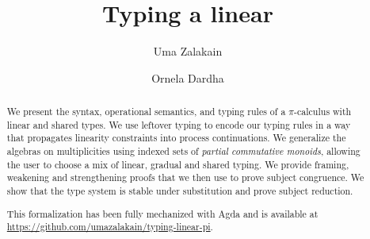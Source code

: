 \documentclass[a4paper,UKenglish,cleveref, autoref, thm-restate,authorcolumns]{lipics-v2019}
\title{Typing a linear \picalc}
\author{Uma Zalakain}{University of Glasgow, Scotland}
       {u.zalakain.1@research.gla.ac.uk}{https://orcid.org/0000-0002-3268-9338}{}
\author{Ornela Dardha}{University of Glasgow, Scotland}
       {ornela.dardha@glasgow.ac.uk}{https://orcid.org/0000-0001-9927-7875}{}
\theoremstyle{definition}
\newcommand{\picalc}{$\pi$-calculus}
\begin{document}
\maketitle

\begin{abstract}
  We present the syntax, operational semantics, and typing rules of a \picalc{} with linear and shared types.
  We use leftover typing \cite{Allais2018a} to encode our typing rules in a way that propagates linearity constraints into process continuations.
  We generalize the algebras on multiplicities using indexed sets of \emph{partial commutative monoids}, allowing the user to choose a mix of linear, gradual and shared typing.
  We provide framing, weakening and strengthening proofs that we then use to prove subject congruence.
  We show that the type system is stable under substitution and prove subject reduction.

  This formalization has been fully mechanized with Agda and is available at \url{https://github.com/umazalakain/typing-linear-pi}.
\end{abstract}

\end{document}
